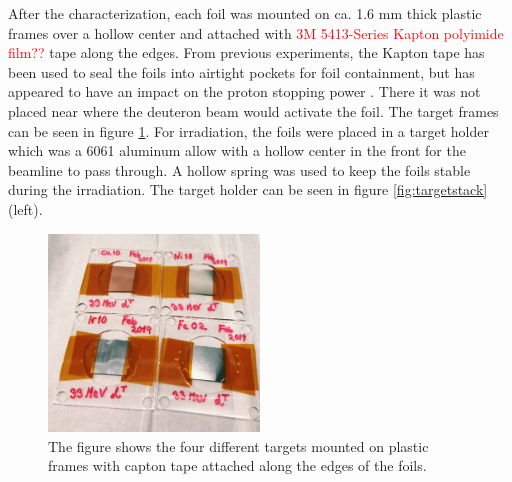 \noindent 
After the characterization, each foil was mounted on ca. 1.6 mm thick plastic frames over a hollow center and attached with \textcolor{red}{3M 5413-Series Kapton polyimide film??} tape along the edges. From previous experiments, the Kapton tape has been used to seal the foils into airtight pockets for foil containment, but has appeared to have an impact on the proton stopping power \cite{https://www.researchgate.net/publication/336796889_Proton-induced_reactions_on_Fe_Cu_Ti_from_threshold_to_55_MeV}. There it was not placed near where the deuteron beam would activate the foil. The target frames can be seen in figure \ref{fig:targets_on_frame}. For irradiation, the foils were placed in a target holder which was a 6061 aluminum allow with a hollow center in the front for the beamline to pass through. A hollow spring was used to keep the foils stable during the irradiation. The target holder can be seen in figure \ref{fig:targetstack} (left).    

\begin{figure}
    \centering
    \includegraphics[width=0.5\textwidth]{Experiment/targets_on_frame.JPG}
    \caption{The figure shows the four different targets mounted on plastic frames with capton tape attached along the edges of the foils.}
    \label{fig:targets_on_frame}
\end{figure}


